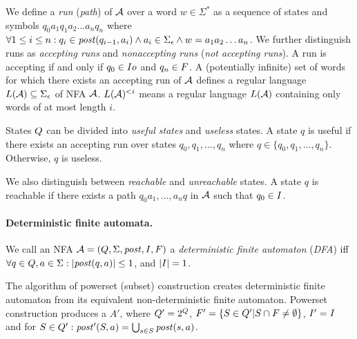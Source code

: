 We define a \emph{run} (\emph{path}) of $\mathcal{A}$ over a word $w \in \Sigma^*$ as a sequence of states and symbols $q_0a_1q_1a_2\ldots a_nq_n$ where $\forall 1 \leq i \leq n: q_i \in \mathit{post}(q_{i-1}, a_i) \land a_i \in \Sigma_\epsilon \land w = a_1a_2\ldots a_n$.
We further distinguish runs as \emph{accepting runs} and \emph{nonaccepting runs} (\emph{not accepting runs}).
A run is accepting if and only if $q_0 \in I  o$ and $q_n \in F$.
A (potentially infinite) set of words for which there exists an accepting run of $\mathcal{A}$ defines a regular language $L(\mathcal{A}) \subseteq \Sigma_\epsilon$ of NFA $\mathcal{A}$. $L(\mathcal{A})^{<i}$ means a regular language $L(\mathcal{A})$ containing only words of at most length $i$.

States $Q$ can be divided into \emph{useful states} and \emph{useless} states.
A state $q$ is useful if there exists an accepting run over states $q_0, q_1, \ldots, q_n$ where $q \in \{ q_0, q_1, \ldots, q_n \}$.
Otherwise, $q$ is useless.

We also distinguish between \emph{reachable} and \emph{unreachable} states.
A state $q$ is reachable if there exists a path $q_0a_1, \ldots, a_nq$ in $\mathcal{A}$ such that $q_0 \in I$.


\paragraph{Deterministic finite automata.}
We call an NFA $\mathcal{A} = (Q, \Sigma
, \mathit{post}, I, F)$ a \emph{deterministic finite automaton} (\emph{DFA}) iff $\forall q \in Q, a \in \Sigma: |\mathit{post}(q, a)| \leq 1
$, and $|I| = 1$.

\begin{definition} \hfill \newline
    The algorithm of powerset (subset) construction creates deterministic finite automaton from its equivalent non-deterministic finite automaton. Powerset construction produces a \dfa $A'$, where $Q' = 2^Q$, $F' = \{S \in Q' | S \cap F \neq \emptyset\}$, $I' = I$ and for $S \in Q': \mathit{post}'(S, a) = \bigcup_{s \in S} \mathit{post}(s, a)$.
\end{definition}

